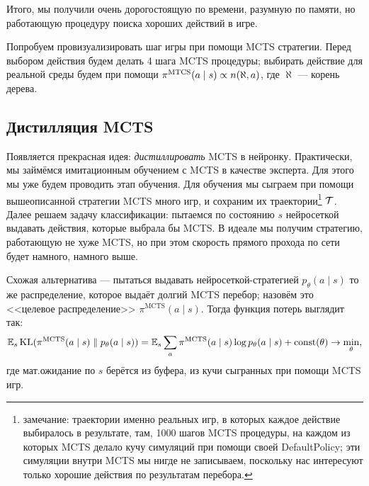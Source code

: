 Итого, мы получили очень дорогостоящую по времени, разумную по памяти, но работающую процедуру поиска хороших действий в игре.

\begin{exampleBox}[label=ex:mcts]{}
Попробуем провизуализировать шаг игры при помощи MCTS стратегии. Перед выбором действия будем делать 4 шага MCTS процедуры; выбирать действие для реальной среды будем при помощи $\pi^{\mathrm{MTCS}}(a \HM\mid s) \propto n(\aleph, a)$, где $\aleph$ --- корень дерева.

\begin{center}
\end{center}
\end{exampleBox}

\subsection{Дистилляция MCTS}

Появляется прекрасная идея: \emph{дистиллировать} MCTS в нейронку. Практически, мы займёмся имитационным обучением с MCTS в качестве эксперта. Для этого мы уже будем проводить этап обучения. Для обучения мы сыграем при помощи вышеописанной стратегии MCTS много игр, и сохраним их траектории\footnote{замечание: траектории именно реальных игр, в которых каждое действие выбиралось в результате, там, 1000 шагов MCTS процедуры, на каждом из которых MCTS делало кучу симуляций при помощи своей DefaultPolicy; эти симуляции внутри MCTS мы нигде не записываем, поскольку нас интересуют только хорошие действия по результатам перебора.} $\mathcal{T}$. Далее решаем задачу классификации: пытаемся по состоянию $s$ нейросеткой выдавать действия, которые выбрала бы MCTS. В идеале мы получим стратегию, работающую не хуже MCTS, но при этом скорость прямого прохода по сети будет намного, намного выше.

Схожая альтернатива --- пытаться выдавать нейросеткой-стратегией $p_{\theta}(a \mid s)$ то же распределение, которое выдаёт долгий MCTS перебор; назовём это <<целевое распределение>> $\pi^{\mathrm{MCTS}}(a \mid s)$. Тогда функция потерь выглядит так:
\begin{equation}\label{distill_mcts}
\mathbb{E}_{s} \operatorname{KL}(\pi^{\mathrm{MCTS}}(a \mid s) \parallel p_{\theta}(a \mid s)) = \mathbb{E}_{s} \sum_a \pi^{\mathrm{MCTS}}(a \mid s) \log p_{\theta}(a \mid s) + \operatorname{const}(\theta) \to \min_{\theta},
\end{equation}
где мат.ожидание по $s$ берётся из буфера, из кучи сыгранных при помощи MCTS игр.

